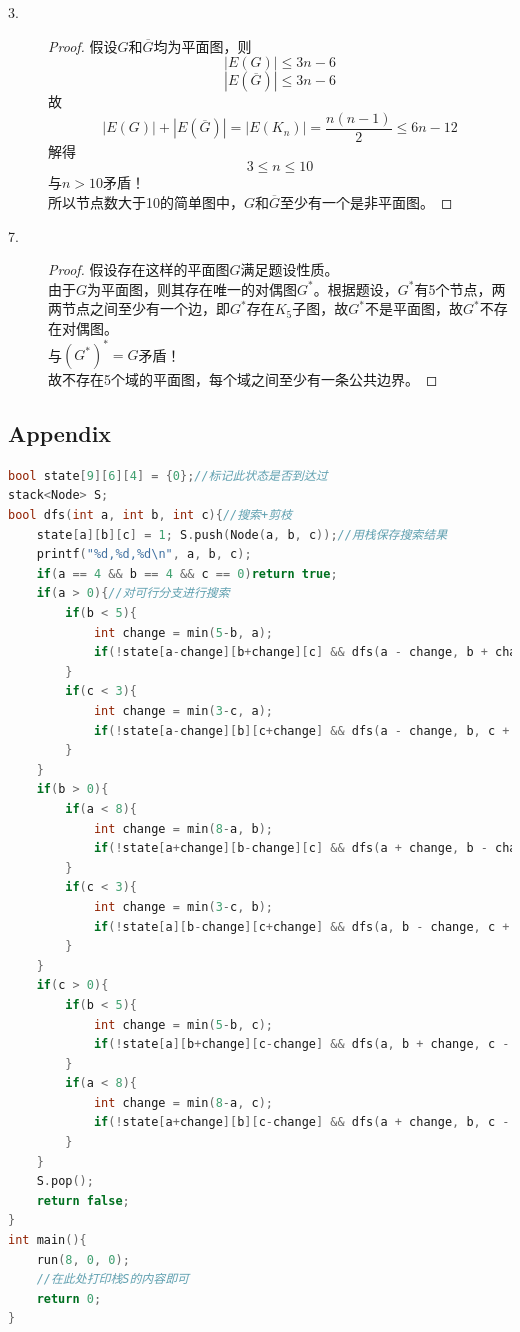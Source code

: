 \documentclass[UTF8, onecolumn, a4paper]{article}
\begin{document}
\begin{description}
\item[3.]
\begin{proof}
假设$G$和$\overline{G}$均为平面图，则
$$|E(G)| \leq 3n-6$$
$$|E(\overline{G})| \leq 3n-6 $$
故$$|E(G)| + |E(\overline{G})| = |E(K_n)| = \frac{n(n-1)}{2}\leq6n-12$$
解得$$3\leq n\leq 10$$
与$n > 10$矛盾！\\所以节点数大于10的简单图中，$G$和$\overline{G}$至少有一个是非平面图。
\end{proof}

\item[7.]
\begin{proof}
假设存在这样的平面图$G$满足题设性质。\\
由于$G$为平面图，则其存在唯一的对偶图$G^*$。根据题设，$G^*$有5个节点，两两节点之间至少有一个边，即$G^*$存在$K_5$子图，故$G^*$不是平面图，故$G^*$不存在对偶图。\\与$(G^*)^* = G$矛盾！\\
故不存在5个域的平面图，每个域之间至少有一条公共边界。
\end{proof}


\end{description}

\begin{appendices}
\section{Appendix}
\begin{lstlisting}[language={c++}, title={test.cpp}] 
bool state[9][6][4] = {0};//标记此状态是否到达过
stack<Node> S;
bool dfs(int a, int b, int c){//搜索+剪枝
	state[a][b][c] = 1; S.push(Node(a, b, c));//用栈保存搜索结果
	printf("%d,%d,%d\n", a, b, c);
	if(a == 4 && b == 4 && c == 0)return true;
	if(a > 0){//对可行分支进行搜索
		if(b < 5){
			int change = min(5-b, a);
			if(!state[a-change][b+change][c] && dfs(a - change, b + change, c))return true;
		}
		if(c < 3){
			int change = min(3-c, a);
			if(!state[a-change][b][c+change] && dfs(a - change, b, c + change))return true;
		}
	}
	if(b > 0){
		if(a < 8){
			int change = min(8-a, b);
			if(!state[a+change][b-change][c] && dfs(a + change, b - change, c))return true;
		}
		if(c < 3){
			int change = min(3-c, b);
			if(!state[a][b-change][c+change] && dfs(a, b - change, c + change))return true;
		}
	}
	if(c > 0){
		if(b < 5){
			int change = min(5-b, c);
			if(!state[a][b+change][c-change] && dfs(a, b + change, c - change))return true;
		}
		if(a < 8){
			int change = min(8-a, c);
			if(!state[a+change][b][c-change] && dfs(a + change, b, c - change))return true;
		}
	}
	S.pop();
	return false;
}
int main(){
	run(8, 0, 0);
	//在此处打印栈S的内容即可
	return 0;
}

\end{lstlisting}
\end{appendices}
\end{document}
